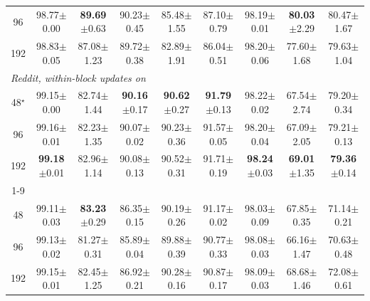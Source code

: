 \begin{table}[p]
\begin{tabular}{ccccccccc}
96 & 98.77{\scriptsize$\pm$0.00} & \textbf{89.69}{\scriptsize$\pm$0.63} & 90.23{\scriptsize$\pm$0.45} & 85.48{\scriptsize$\pm$1.55} & 87.10{\scriptsize$\pm$0.79} & 98.19{\scriptsize$\pm$0.01} & \textbf{80.03}{\scriptsize$\pm$2.29} & 80.47{\scriptsize$\pm$1.67} \\
192 & 98.83{\scriptsize$\pm$0.05} & 87.08{\scriptsize$\pm$1.23} & 89.72{\scriptsize$\pm$0.38} & 82.89{\scriptsize$\pm$1.91} & 86.04{\scriptsize$\pm$0.51} & 98.20{\scriptsize$\pm$0.06} & 77.60{\scriptsize$\pm$1.68} & 79.63{\scriptsize$\pm$1.04} \\
\midrule
\multicolumn{9}{l}{\textit{Reddit, within-block updates on}} \\
48$^\star$ & 99.15{\scriptsize$\pm$0.00} & 82.74{\scriptsize$\pm$1.44} & \textbf{90.16}{\scriptsize$\pm$0.17} & \textbf{90.62}{\scriptsize$\pm$0.27} & \textbf{91.79}{\scriptsize$\pm$0.13} & 98.22{\scriptsize$\pm$0.02} & 67.54{\scriptsize$\pm$2.74} & 79.20{\scriptsize$\pm$0.34} \\
96 & 99.16{\scriptsize$\pm$0.01} & 82.23{\scriptsize$\pm$1.35} & 90.07{\scriptsize$\pm$0.02} & 90.23{\scriptsize$\pm$0.36} & 91.57{\scriptsize$\pm$0.05} & 98.20{\scriptsize$\pm$0.04} & 67.09{\scriptsize$\pm$2.05} & 79.21{\scriptsize$\pm$0.13} \\
192 & \textbf{99.18}{\scriptsize$\pm$0.01} & 82.96{\scriptsize$\pm$1.14} & 90.08{\scriptsize$\pm$0.13} & 90.52{\scriptsize$\pm$0.31} & 91.71{\scriptsize$\pm$0.19} & \textbf{98.24}{\scriptsize$\pm$0.03} & \textbf{69.01}{\scriptsize$\pm$1.35} & \textbf{79.36}{\scriptsize$\pm$0.14} \\
\cmidrule(lr){1-9}
\multicolumn{9}{l}{\textit{Reddit, within-block updates off}} \\
48 & 99.11{\scriptsize$\pm$0.03} & \textbf{83.23}{\scriptsize$\pm$0.29} & 86.35{\scriptsize$\pm$0.15} & 90.19{\scriptsize$\pm$0.26} & 91.17{\scriptsize$\pm$0.02} & 98.03{\scriptsize$\pm$0.09} & 67.85{\scriptsize$\pm$0.35} & 71.14{\scriptsize$\pm$0.21} \\
96 & 99.13{\scriptsize$\pm$0.02} & 81.27{\scriptsize$\pm$0.31} & 85.89{\scriptsize$\pm$0.04} & 89.88{\scriptsize$\pm$0.39} & 90.77{\scriptsize$\pm$0.33} & 98.08{\scriptsize$\pm$0.03} & 66.16{\scriptsize$\pm$1.47} & 70.63{\scriptsize$\pm$0.48} \\
192 & 99.15{\scriptsize$\pm$0.01} & 82.45{\scriptsize$\pm$1.25} & 86.92{\scriptsize$\pm$0.21} & 90.28{\scriptsize$\pm$0.16} & 90.87{\scriptsize$\pm$0.17} & 98.09{\scriptsize$\pm$0.03} & 68.68{\scriptsize$\pm$1.46} & 72.08{\scriptsize$\pm$0.61} \\

\end{tabular}
\end{table}
